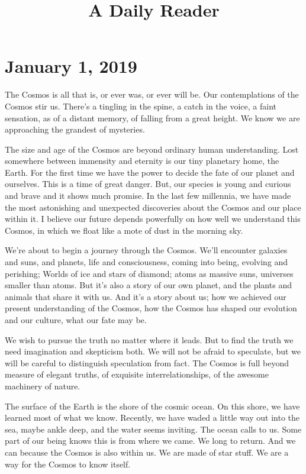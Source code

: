 \documentclass[letterpaper,9pt]{book}
\title{A Daily Reader}
\begin{document}
\maketitle

\chapter{January 1, 2019}

The Cosmos is all that is, or ever was, or ever will be. Our contemplations of the Cosmos stir us. There's a tingling in the spine, a catch in the voice, a faint sensation, as of a distant memory, of falling from a great height. We know we are approaching the grandest of mysteries.

The size and age of the Cosmos are beyond ordinary human understanding. Lost somewhere between immensity and eternity is our tiny planetary home, the Earth. For the first time we have the power to decide the fate of our planet and ourselves. This is a time of great danger. But, our species is young and curious and brave and it shows much promise. In the last few millennia, we have made the most astonishing and unexpected discoveries about the Cosmos and our place within it. I believe our future depends powerfully on how well we understand this Cosmos, in which we float like a mote of dust in the morning sky.

We're about to begin a journey through the Cosmos. We'll encounter galaxies and suns, and planets, life and consciousness, coming into being, evolving and perishing; Worlds of ice and stars of diamond; atoms as massive suns, universes smaller than atoms. But it's also a story of our own planet, and the plants and animals that share it with us. And it's a story about us; how we achieved our present understanding of the Cosmos, how the Cosmos has shaped our evolution and our culture, what our fate may be.

We wish to pursue the truth no matter where it leads. But to find the truth we need imagination and skepticism both. We will not be afraid to speculate, but we will be careful to distinguish speculation from fact. The Cosmos is full beyond measure of elegant truths, of exquisite interrelationships, of the awesome machinery of nature.

The surface of the Earth is the shore of the cosmic ocean. On this shore, we have learned most of what we know. Recently, we have waded a little way out into the sea, maybe ankle deep, and the water seems inviting. The ocean calls to us. Some part of our being knows this is from where we came. We long to return. And we can because the Cosmos is also within us. We are made of star stuff. We are a way for the Cosmos to know itself.
\end{document}

